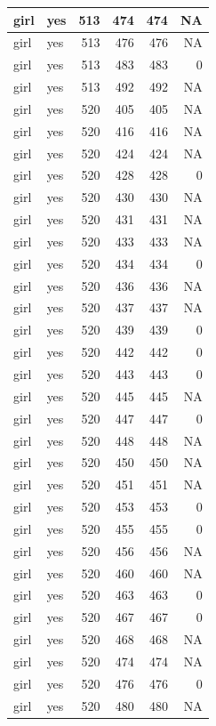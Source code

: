 \documentclass[man]{apa6}
\begin{document}
\begin{tabular}{l|l|r|r|r|r}
\hline
girl & yes & 513 & 474 & 474 & NA\\
\hline
girl & yes & 513 & 476 & 476 & NA\\
\hline
girl & yes & 513 & 483 & 483 & 0\\
\hline
girl & yes & 513 & 492 & 492 & NA\\
\hline
girl & yes & 520 & 405 & 405 & NA\\
\hline
girl & yes & 520 & 416 & 416 & NA\\
\hline
girl & yes & 520 & 424 & 424 & NA\\
\hline
girl & yes & 520 & 428 & 428 & 0\\
\hline
girl & yes & 520 & 430 & 430 & NA\\
\hline
girl & yes & 520 & 431 & 431 & NA\\
\hline
girl & yes & 520 & 433 & 433 & NA\\
\hline
girl & yes & 520 & 434 & 434 & 0\\
\hline
girl & yes & 520 & 436 & 436 & NA\\
\hline
girl & yes & 520 & 437 & 437 & NA\\
\hline
girl & yes & 520 & 439 & 439 & 0\\
\hline
girl & yes & 520 & 442 & 442 & 0\\
\hline
girl & yes & 520 & 443 & 443 & 0\\
\hline
girl & yes & 520 & 445 & 445 & NA\\
\hline
girl & yes & 520 & 447 & 447 & 0\\
\hline
girl & yes & 520 & 448 & 448 & NA\\
\hline
girl & yes & 520 & 450 & 450 & NA\\
\hline
girl & yes & 520 & 451 & 451 & NA\\
\hline
girl & yes & 520 & 453 & 453 & 0\\
\hline
girl & yes & 520 & 455 & 455 & 0\\
\hline
girl & yes & 520 & 456 & 456 & NA\\
\hline
girl & yes & 520 & 460 & 460 & NA\\
\hline
girl & yes & 520 & 463 & 463 & 0\\
\hline
girl & yes & 520 & 467 & 467 & 0\\
\hline
girl & yes & 520 & 468 & 468 & NA\\
\hline
girl & yes & 520 & 474 & 474 & NA\\
\hline
girl & yes & 520 & 476 & 476 & 0\\
\hline
girl & yes & 520 & 480 & 480 & NA\\

\end{tabular}
\end{document}
